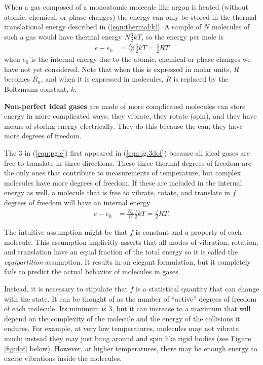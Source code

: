When a gas composed of a monoatomic molecule like argon is heated (without atomic, chemical, or phase changes) the energy can only be stored in the thermal translational energy described in (\ref{eqn:thermal:k}).  A sample of $N$ molecules of such a gas would have thermal energy $N \frac{3}{2} k T$, so the energy per mole is
\begin{align}
e - e_0 &= \frac{N_a}{W} \frac{3}{2} k T = \frac{3}{2} R T \label{eqn:pg:e}
\end{align}
when $e_0$ is the internal energy due to the atomic, chemical or phase changes we have not yet considered.  Note that when this is expressed in molar units, $R$ becomes $R_u$, and when it is expressed in molecules, $R$ is replaced by the Boltzmann constant, $k$.

{\bf Non-perfect ideal gases} are made of more complicated molecules can store energy in more complicated ways; they vibrate, they rotate (spin), and they have means of storing energy electrically.  They do this because the can; they have more degrees of freedom.

The 3 in (\ref{eqn:pg:e}) first appeared in (\ref{eqn:ig:3dof}) because all ideal gases are free to translate in three directions.  These three thermal degrees of freedom are the only ones that contribute to measurements of temperature, but complex molecules have more degrees of freedom.  If these are included in the internal energy as well, a molecule that is free to vibrate, rotate, and translate in $f$ degrees of freedom will have an internal energy
\begin{align}
e - e_0 &= \frac{N_a}{W} \frac{f}{2} k T = \frac{f}{2} R T.
\end{align}

The intuitive assumption might be that $f$ is constant and a property of each molecule.  This assumption implicitly asserts that all modes of vibration, rotation, and translation have an equal fraction of the total energy so it is called the \emph{equipartition} assumption.  It results in an elegant formulation, but it completely fails to predict the actual behavior of molecules in gases.

Instead, it is necessary to stipulate that $f$ is a statistical quantity that can change with the state.  It can be thought of as the number of ``active'' degrees of freedom of each molecule.  Its minimum is 3, but it can increase to a maximum that will depend on the complexity of the molecule and the energy of the collisions it endures.  For example, at very low temperatures, molecules may not vibrate much; instead they may just bang around and spin like rigid bodies (see Figure \ref{fig:dof} below).  However, at higher temperatures, there may be enough energy to excite vibrations inside the molecules.

